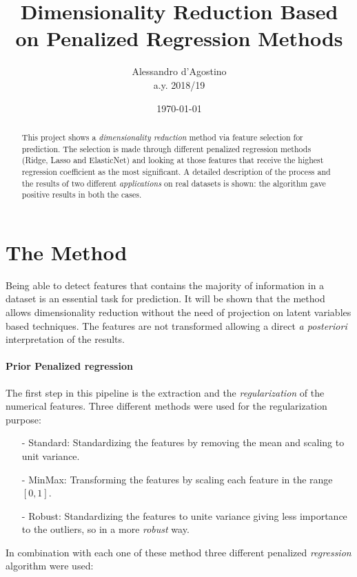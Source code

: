 \documentclass{article}
\title{Dimensionality Reduction Based on Penalized Regression Methods}
\author{Alessandro d'Agostino \\
		a.y. 2018/19 \\
	}
\date{\today}
\begin{document}
\maketitle

\begin{abstract}
	This project shows a \emph{dimensionality reduction} method via feature selection for prediction. The selection is made through different penalized regression methods (Ridge, Lasso and ElasticNet) and looking at those features that receive the highest regression coefficient as the most significant.
	A detailed description of the process and the results of two different \emph{applications} on real datasets is shown: the algorithm gave positive results in both the cases.
\end{abstract}

\section*{The Method}
Being able to detect features that contains the majority of information in a dataset is an essential task for prediction. It will be shown that the method allows dimensionality reduction without the need of projection on latent variables based techniques. The features are not transformed allowing a direct \emph{a posteriori} interpretation of the results.

\paragraph{Prior Penalized regression}

The first step in this pipeline is the extraction and the \emph{regularization} of the numerical features. Three different methods were used for the regularization purpose:

\begin{itemize}
\item [-] Standard: Standardizing the features by removing the mean and scaling to unit variance.
\item [-] MinMax: Transforming the features by scaling each feature in the range $[0,1]$.
\item [-] Robust: Standardizing the features to unite variance giving less importance to the outliers, so in a more \emph{robust} way.

\end{itemize}

In combination with each one of these method three different penalized \emph{regression} algorithm were used:
\end{document}
